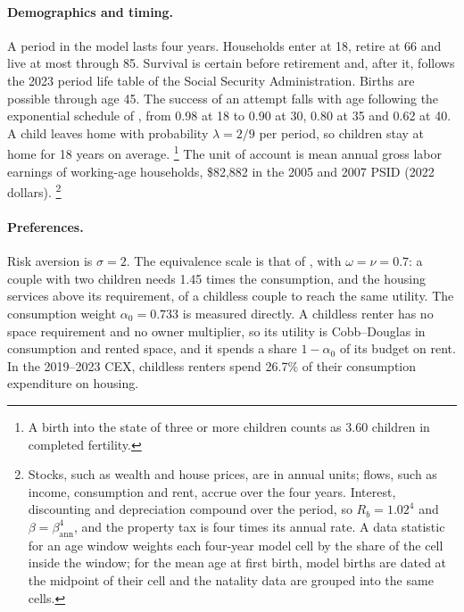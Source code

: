 \paragraph{Demographics and timing.}
A period in the model lasts four years. Households enter at 18, retire at 66
and live at most through 85. Survival is certain before retirement and,
after it, follows the 2023 period life table of the Social Security
Administration. Births are possible through age 45. The success of an
attempt falls with age following the exponential schedule of
\citet{sommerFertilityChoiceLife2016}, from 0.98 at 18 to 0.90 at 30, 0.80
at 35 and 0.62 at 40. A child leaves home with probability $\lambda=2/9$ per
period, so children stay at home for 18 years on average.%
\footnote{A birth into the state of three or more children counts as 3.60
children in completed fertility.}
The unit of account is mean annual gross labor earnings of working-age
households, \$82,882 in the 2005 and 2007 PSID (2022 dollars).%
\footnote{Stocks, such as wealth and house prices, are in annual units;
flows, such as income, consumption and rent, accrue over the four years.
Interest, discounting and depreciation compound over the period, so
$R_b=1.02^4$ and $\beta=\beta_{\text{ann}}^4$, and the property tax is four
times its annual rate. A data statistic for an age window weights each
four-year model cell by the share of the cell inside the window; for the
mean age at first birth, model births are dated at the midpoint of their
cell and the natality data are grouped into the same cells.}

\paragraph{Preferences.}
Risk aversion is $\sigma=2$. The equivalence scale is that of
\citet{scholzSeshadriKhitatrakunSaving2006}, with $\omega=\nu=0.7$: a couple
with two children needs 1.45 times the consumption, and the housing services
above its requirement, of a childless couple to reach the same utility. The
consumption weight $\alpha_0=0.733$ is measured directly. A childless renter
has no space requirement and no owner multiplier, so its utility is
Cobb--Douglas in consumption and rented space, and it spends a share
$1-\alpha_0$ of its budget on rent. In the 2019--2023 CEX, childless renters
spend 26.7\% of their consumption expenditure on housing.

